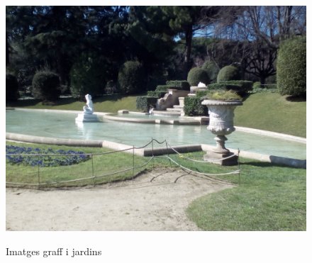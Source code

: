 \begin{figure}[!htb]
				\label{fig:awesome_image3}
			\endminipage\hfill
				\includegraphics[width=\linewidth]{images/experiments/jardi2}
				\label{fig:awesome_image3}
			\endminipage
			\caption{Imatges graff i jardins}
		\end{figure}

